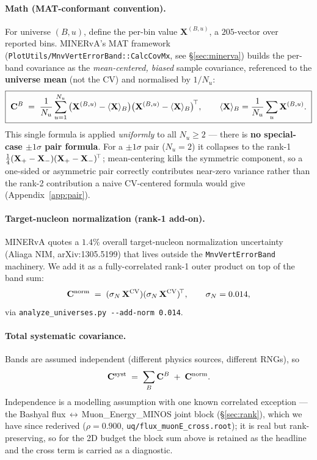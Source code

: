 \paragraph{Math (MAT-conformant convention).}
For universe $(B,u)$, define the per-bin value
$\mathbf{X}^{(B,u)}$, a $205$-vector over reported bins. MINERvA's MAT
framework
(\texttt{PlotUtils/MnvVertErrorBand::CalcCovMx}, see \S\ref{sec:minerva})
builds the per-band covariance as the \emph{mean-centered, biased}
sample covariance, referenced to the \textbf{universe mean} (not the
CV) and normalised by $1/N_{u}$:
\begin{equation}
\boxed{\;
\mathbf{C}^{B}
\;=\;
\frac{1}{N_{u}}\sum_{u=1}^{N_{u}}
\big(\mathbf{X}^{(B,u)} - \langle\mathbf{X}\rangle_{B}\big)
\big(\mathbf{X}^{(B,u)} - \langle\mathbf{X}\rangle_{B}\big)^{\!\top},
\qquad
\langle\mathbf{X}\rangle_{B} = \frac{1}{N_{u}}\sum_{u}\mathbf{X}^{(B,u)}.
\;}
\label{eq:matcov}
\end{equation}
This single formula is applied \emph{uniformly} to all $N_{u}\ge 2$ ---
there is \textbf{no special-case $\pm1\sigma$ pair formula}. For a
$\pm1\sigma$ pair ($N_{u}=2$) it collapses to the rank-1
$\tfrac14(\mathbf{X}_{+}-\mathbf{X}_{-})(\mathbf{X}_{+}-\mathbf{X}_{-})^{\!\top}$;
mean-centering kills the symmetric component, so a one-sided or
asymmetric pair correctly contributes near-zero variance rather than
the rank-2 contribution a naive CV-centered formula would give
(Appendix~\ref{app:pair}).

\paragraph{Target-nucleon normalization (rank-1 add-on).}
MINERvA quotes a $1.4\%$ overall target-nucleon normalization
uncertainty (Aliaga NIM, arXiv:1305.5199) that lives outside the
\texttt{MnvVertErrorBand} machinery. We add it as a fully-correlated
rank-1 outer product on top of the band sum:
\begin{equation}
\mathbf{C}^{\text{norm}} \;=\; (\sigma_{N}\,\mathbf{X}^{\text{CV}})(\sigma_{N}\,\mathbf{X}^{\text{CV}})^{\!\top},
\qquad \sigma_{N} = 0.014,
\label{eq:normband}
\end{equation}
via \texttt{analyze\_universes.py -{}-add-norm 0.014}.

\paragraph{Total systematic covariance.}
Bands are assumed independent (different physics sources, different
RNGs), so
\begin{equation}
\mathbf{C}^{\text{syst}}
\;=\;
\sum_{B}\mathbf{C}^{B}\;+\;\mathbf{C}^{\text{norm}}.
\label{eq:systblocksum}
\end{equation}
Independence is a modelling assumption with one known correlated exception --- the
Bashyal flux\,$\leftrightarrow$\,Muon\_Energy\_MINOS joint block
(\S\ref{sec:rank}), which we have since rederived ($\rho=0.900$,
\texttt{uq/flux\_muonE\_cross.root}); it is real but rank-preserving, so for the
2D budget the block sum above is retained as the headline and the cross term is
carried as a diagnostic.

